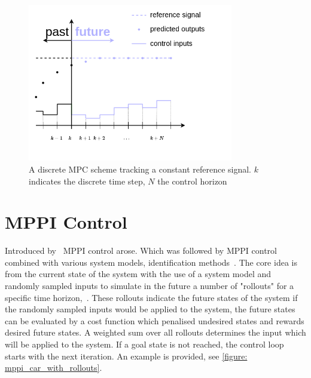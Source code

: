 \begin{figure}[H]
    \centering
    \includegraphics[width=0.8\textwidth]{figures/appendix/MPC_simple_diagram.png}
    \caption{A discrete \acs{MPC} scheme tracking a constant reference signal. $k$ indicates the discrete time step, $N$ the control horizon}
    \label{figure: mpc_scheme_basic}
\end{figure}

\section{\ac{MPPI} Control}
\label{sec:appendix_mppi}
Introduced by~\cite{williams_model_2015} \ac{MPPI} control arose. Which was followed by \ac{MPPI} control combined with various system models, identification methods~\cite{abraham_modelbased_2020,cong_selfadapting_2020,arruda_uncertainty_2017}. The core idea is from the current state of the system with the use of a system model and randomly sampled inputs to simulate in the future a number of "rollouts" for a specific time horizon,~\cite{neuromorphictutorial_ltc21_2021}. These rollouts indicate the future states of the system if the randomly sampled inputs would be applied to the system, the future states can be evaluated by a cost function which penalised undesired states and rewards desired future states. A weighted sum over all rollouts determines the input which will be applied to the system. If a goal state is not reached, the control loop starts with the next iteration. An example is provided, see  \cref{figure: mppi_car_with_rollouts}. 

